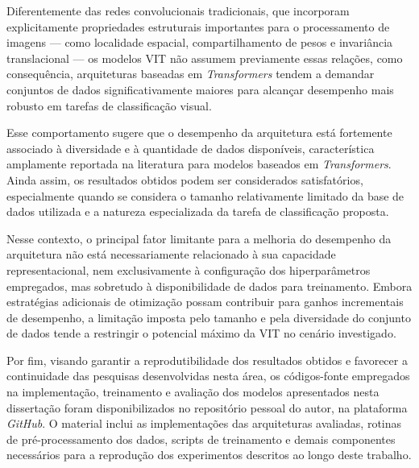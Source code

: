 Diferentemente das redes convolucionais tradicionais, que incorporam explicitamente propriedades estruturais importantes para o processamento de imagens — como localidade espacial, compartilhamento de pesos e invariância translacional — os modelos \acs{VIT} não assumem previamente essas relações, como consequência, arquiteturas baseadas em \textit{Transformers} tendem a demandar conjuntos de dados significativamente maiores para alcançar desempenho mais robusto em tarefas de classificação visual.

Esse comportamento sugere que o desempenho da arquitetura está fortemente associado à diversidade e à quantidade de dados disponíveis, característica amplamente reportada na literatura para modelos baseados em \textit{Transformers}. Ainda assim, os resultados obtidos podem ser considerados satisfatórios, especialmente quando se considera o tamanho relativamente limitado da base de dados utilizada e a natureza especializada da tarefa de classificação proposta.

Nesse contexto, o principal fator limitante para a melhoria do desempenho da arquitetura não está necessariamente relacionado à sua capacidade representacional, nem exclusivamente à configuração dos hiperparâmetros empregados, mas sobretudo à disponibilidade de dados para treinamento. Embora estratégias adicionais de otimização possam contribuir para ganhos incrementais de desempenho, a limitação imposta pelo tamanho e pela diversidade do conjunto de dados tende a restringir o potencial máximo da \acs{VIT} no cenário investigado.

Por fim, visando garantir a reprodutibilidade dos resultados obtidos e favorecer a continuidade das pesquisas desenvolvidas nesta área, os códigos-fonte empregados na implementação, treinamento e avaliação dos modelos apresentados nesta dissertação foram disponibilizados no repositório pessoal do autor, na plataforma \textit{GitHub}. O material inclui as implementações das arquiteturas avaliadas, rotinas de pré-processamento dos dados, scripts de treinamento e demais componentes necessários para a reprodução dos experimentos descritos ao longo deste trabalho. 